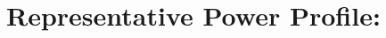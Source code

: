 \documentclass{achemso}
\begin{document}
\section*{Representative Power Profile:}
\vspace{-0.5cm}



\end{document}
